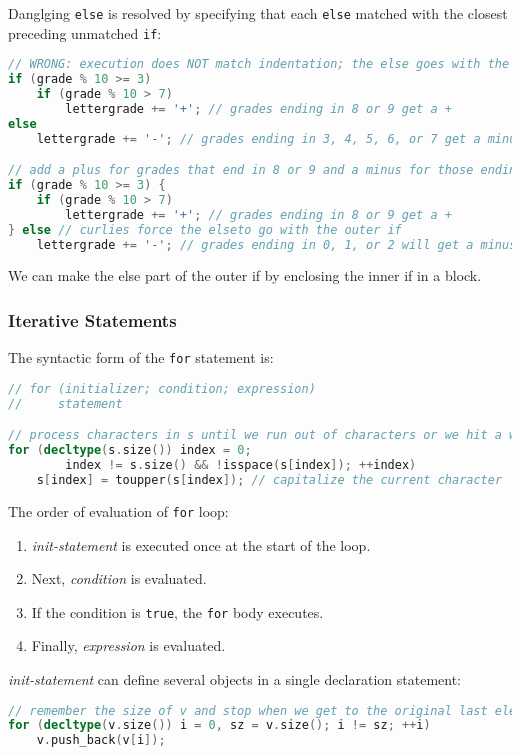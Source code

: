 Danglging \texttt{else} is resolved by specifying that each \texttt{else} matched with the closest preceding unmatched \texttt{if}:
\begin{lstlisting}[language=C++]
// WRONG: execution does NOT match indentation; the else goes with the inner if 
if (grade % 10 >= 3) 
    if (grade % 10 > 7) 
        lettergrade += '+'; // grades ending in 8 or 9 get a + 
else 
    lettergrade += '-'; // grades ending in 3, 4, 5, 6, or 7 get a minus!

// add a plus for grades that end in 8 or 9 and a minus for those ending in 0, 1, or 2 
if (grade % 10 >= 3) { 
    if (grade % 10 > 7) 
        lettergrade += '+'; // grades ending in 8 or 9 get a + 
} else // curlies force the elseto go with the outer if 
    lettergrade += '-'; // grades ending in 0, 1, or 2 will get a minus
\end{lstlisting}
We can make the else part of the outer if by enclosing the inner if in a block.

\subsubsection{Iterative Statements}

The syntactic form of the \texttt{for} statement is:
\begin{lstlisting}[language=C++]
// for (initializer; condition; expression) 
//     statement

// process characters in s until we run out of characters or we hit a whitespace 
for (decltype(s.size()) index = 0; 
        index != s.size() && !isspace(s[index]); ++index)     
    s[index] = toupper(s[index]); // capitalize the current character
\end{lstlisting}

The order of evaluation of \texttt{for} loop:
\begin{enumerate}
\item \textit{init-statement} is executed once at the start of the loop. 
\item Next, \textit{condition} is evaluated.
\item If the condition is \texttt{true}, the \texttt{for} body executes. 
\item Finally, \textit{expression} is evaluated. 
\end{enumerate}

\textit{init-statement} can define several objects in a single declaration statement:
\begin{lstlisting}[language=C++]
// remember the size of v and stop when we get to the original last element 
for (decltype(v.size()) i = 0, sz = v.size(); i != sz; ++i) 
    v.push_back(v[i]);
\end{lstlisting}

